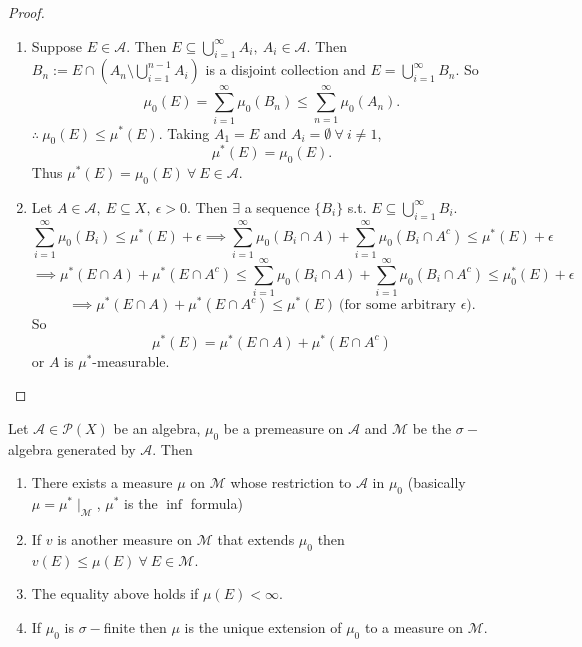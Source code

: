 \documentclass{functionspaces}
\begin{document}
\begin{proof}
\begin{enumerate}
    \item Suppose $E \in \mathcal{A}.$ Then $E \subseteq \bigcup_{i=1}^{\infty} A_{i},\ A_{i} \in \mathcal{A}.$ Then $B_{n} := E \cap \left(A_{n} \setminus \bigcup_{i=1}^{n-1} A_{i}\right)$ is a disjoint collection and $E = \bigcup_{i=1}^{\infty} B_{n}.$ So
    \[
    \mu_{0}(E) = \sum_{i=1}^{\infty} \mu_{0}(B_{n}) \leq \sum_{n=1}^{\infty} \mu_{0}(A_{n}).
    \]
    $\therefore\ \mu_{0}(E) \leq \mu^{*}(E).$ Taking $A_{1} = E$ and $A_{i} = \emptyset\ \forall\ i \neq 1$,
    \[
    \mu^{*}(E) = \mu_{0}(E).
    \]
    Thus $\mu^{*}(E) = \mu_{0}(E)\ \forall\ E \in \mathcal{A}$.
    
    \item Let $A \in \mathcal{A},\ E \subseteq X,\ \epsilon > 0.$ Then $\exists$ a sequence $\{B_{i}\}$ s.t. $E \subseteq \bigcup_{i=1}^{\infty} B_{i}$.
    \[
    \sum_{i=1}^{\infty} \mu_{0}(B_{i}) \leq \mu^{*}(E) + \epsilon \implies \sum_{i=1}^{\infty} \mu_{0}(B_{i} \cap A) + \sum_{i=1}^{\infty} \mu_{0}(B_{i} \cap A^{c}) \leq \mu^{*}(E) + \epsilon
    \]
    \[
    \implies \mu^{*}(E \cap A) + \mu^{*}(E \cap A^{c}) \leq \sum_{i=1}^{\infty} \mu_{0}(B_{i} \cap A) + \sum_{i=1}^{\infty} \mu_{0}(B_{i} \cap A^{c}) \leq \mu_{0}^{*}(E) + \epsilon
    \]
    \[
    \implies \mu^{*}(E \cap A) + \mu^{*}(E \cap A^{c}) \leq \mu^{*}(E)\ \text{(for some arbitrary $\epsilon$)}.
    \]
    So
    \[
    \mu^{*}(E) = \mu^{*}(E \cap A) + \mu^{*}(E \cap A^{c})
    \]
    or $A$ is $\mu^{*}$-measurable.
\end{enumerate}
\end{proof}

\begin{theorem}
Let $\mathcal{A} \in \mathcal{P}(X)$ be an algebra, $\mu_{0}$ be a premeasure on $\mathcal{A}$ and $\mathcal{M}$ be the $\sigma-$algebra generated by $\mathcal{A}$. Then

\begin{enumerate}
    \item There exists a measure $\mu$ on $\mathcal{M}$ whose restriction to $\mathcal{A}$ in $\mu_{0}$ (basically $\mu = \mu^{*} \mid_{\mathcal{M}}$, $\mu^{*}$ is the $\inf$ formula)
    \item If $v$ is another measure on $\mathcal{M}$ that extends $\mu_{0}$ then $v(E) \leq \mu(E)\ \forall\ E \in \mathcal{M}$.
    \item The equality above holds if $\mu(E) < \infty$.
    \item If $\mu_{0}$ is $\sigma-$finite then $\mu$ is the unique extension of $\mu_{0}$ to a measure on $\mathcal{M}$.
\end{enumerate}
\end{theorem}
\end{document}
